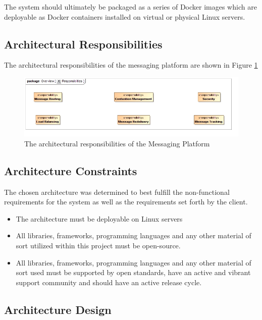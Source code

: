 The system should ultimately be packaged as a series of Docker images which are
deployable as Docker containers installed on virtual or physical Linux servers.

\subsection{Architectural Responsibilities}
The architectural responsibilities of the messaging platform are shown in 
Figure \ref{fig:ESBResponsibilities}
\begin{figure}[H]
	\begin{center}
	\includegraphics[scale=0.5]{../Diagrams and Charts/Overview/Responsibilities.jpg}
	\caption{The architectural responsibilities of the Messaging Platform}
	\label{fig:ESBResponsibilities}
	\end{center}
\end{figure}

\subsection{Architecture Constraints}
\label{sec:systemArchitecturalConstraints}
The chosen architecture was determined to best fulfill the non-functional
requirements for the system as well as the requirements set forth by the
client.
\begin{itemize}
	\item The architecture must be deployable on Linux servers
	\item All libraries, frameworks, programming languages and any other
	material of sort utilized within this project must be open-source.
	\item All libraries, frameworks, programming languages and any other
	material of sort used must be supported by open standards, have an 
	active and vibrant support community and should have an active 
	release cycle. 	
\end{itemize}

\subsection{Architecture Design}
